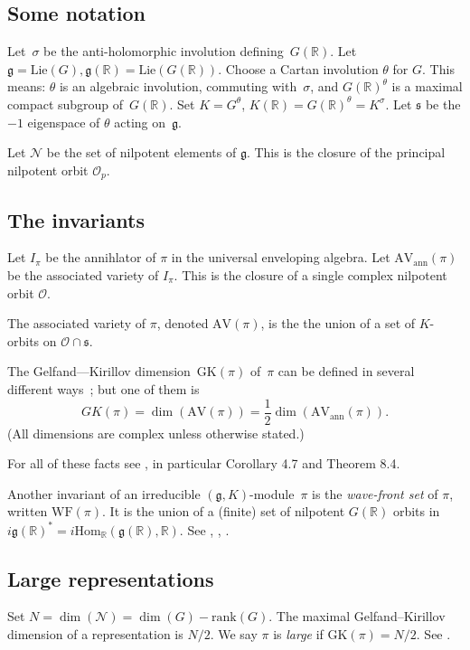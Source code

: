 \documentclass[10pt,leqno]{article}
\newcommand{\Hom}{\mathrm{Hom}}
\renewcommand{\O}{\mathcal O}
\newcommand{\R}{\mathbb R}
\newcommand{\N}{\mathcal N}
\newcommand{\Lie}{\mathrm{Lie}}
\newcommand{\g}{\mathfrak g}
\newcommand{\s}{\mathfrak s}
\newcommand{\AV}{\mathrm{AV}}
\newcommand{\WF}{\mathrm{WF}}
\newcommand{\AVann}{\mathrm{AV}_{\mathrm{ann}}}
\newcommand{\GK}{\mathrm{GK}}
\newcommand{\Op}{\O_p}
\begin{document}
\subsection{Some notation}

Let~$\sigma$ be the anti-holomorphic involution defining~$G(\R)$. 
Let $\g=\Lie(G), \g(\R)=\Lie(G(\R))$. Choose a Cartan involution $\theta$ for $G$. This means:
$\theta$ is an algebraic involution, commuting with~$\sigma$,
and $G(\R)^\theta$ is a maximal compact subgroup of~$G(\R)$. Set $K=G^\theta$, $K(\R)=G(\R)^\theta=K^\sigma$.
Let $\s$ be the $-1$ eigenspace of $\theta$ acting on~$\g$.

Let $\N$ be the set of nilpotent elements of $\g$.
This is the closure of the principal nilpotent orbit $\Op$.

 \subsection{The invariants}


Let $I_\pi$ be the annihlator of $\pi$ in the universal enveloping algebra.
Let $\AVann(\pi)$ be the associated variety of $I_\pi$. 
This is the closure of a single complex nilpotent orbit $\O$.

The associated variety of $\pi$, denoted $\AV(\pi)$, is the  the union of a set of
$K$-orbits on $\O\cap\s$.

The Gelfand---Kirillov dimension~$\GK(\pi)$ of~$\pi$ can be defined in several different ways~\cite{vogan-gelfand-kirillov}; but one of them is
$$
GK(\pi)=\dim(\AV(\pi))=\frac12\dim(\AVann(\pi)).
$$
(All dimensions are complex unless otherwise stated.)

For all of these facts see \cite{vogan_bowdoin}, in particular Corollary 4.7 and Theorem 8.4.

Another invariant of an irreducible $(\g, K)$-module~$\pi$ is the \emph{wave-front set} of $\pi$, written $\WF(\pi)$. It is the union of a (finite) set of nilpotent $G(\R)$ orbits in
$i\g(\R)^*=i\Hom_\R(\g(\R),\R)$. See \cite{howe_wave_front}, \cite{bv_local_structure}, \cite{HarrisHeOlafsson}.

\subsection{Large representations} Set $N=\dim(\N)=\dim(G)-\mathrm{rank}(G)$. The maximal Gelfand--Kirillov dimension of a representation is $N/2$.
We say $\pi$ is {\it large} if $\GK(\pi)=N/2$. See \cite[Section~6]{Vogan78}. 
\end{document}

